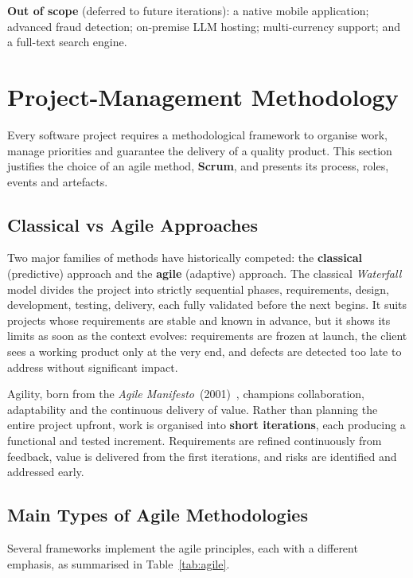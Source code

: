 \medskip
\noindent\textbf{Out of scope} (deferred to future iterations):
a native mobile application; advanced fraud detection; on-premise LLM
hosting; multi-currency support; and a full-text search engine.

\section{Project-Management Methodology}

Every software project requires a methodological framework to organise
work, manage priorities and guarantee the delivery of a quality
product. This section justifies the choice of an agile method, 
\textbf{Scrum}, and presents its process, roles, events and
artefacts.

\subsection{Classical vs Agile Approaches}

Two major families of methods have historically competed: the
\textbf{classical} (predictive) approach and the \textbf{agile}
(adaptive) approach. The classical \emph{Waterfall} model divides the
project into strictly sequential phases, requirements, design,
development, testing, delivery, each fully validated before the next
begins. It suits projects whose requirements are stable and known in
advance, but it shows its limits as soon as the context evolves:
requirements are frozen at launch, the client sees a working product
only at the very end, and defects are detected too late to address
without significant impact.

Agility, born from the \textit{Agile
Manifesto}~(2001)~\cite{agilemanifesto}, champions collaboration,
adaptability and the continuous delivery of value. Rather than planning
the entire project upfront, work is organised into \textbf{short
iterations}, each producing a functional and tested increment.
Requirements are refined continuously from feedback, value is delivered
from the first iterations, and risks are identified and addressed early.

\subsection{Main Types of Agile Methodologies}

Several frameworks implement the agile principles, each with a different
emphasis, as summarised in Table~\ref{tab:agile}.

